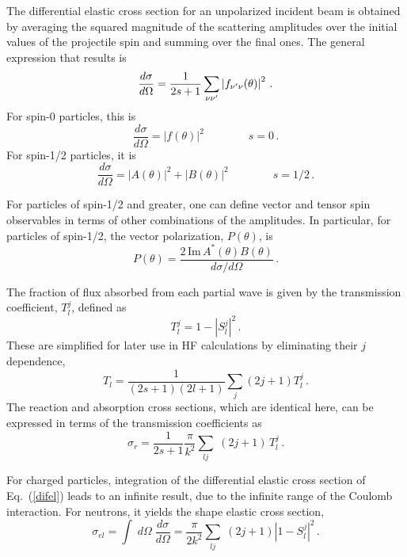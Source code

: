 The differential elastic cross section for an unpolarized incident beam is
obtained by averaging the squared magnitude of the scattering amplitudes
over the initial values of the projectile spin and summing over the final
ones. The general expression that results is 
\begin{equation}
\frac{d\sigma}{d\Omega}=\frac{1}{2s+1}\sum_{\nu\nu^{\prime}}\left|f_{\nu^{%
\prime}\nu}(\theta)\right|^{2}\,.  \label{difel}
\end{equation}
For spin-0 particles, this is 
\begin{equation}
\frac{d\sigma}{d\Omega}=\left|f(\theta)\right|^{2}\qquad\qquad s=0\,.
\end{equation}
For spin-1/2 particles, it is 
\begin{equation}
\frac{d\sigma}{d\Omega}=\left|A(\theta)\right|^{2}+\left|B(\theta)%
\right|^{2}\qquad\qquad s=1/2\,.
\end{equation}

For particles of spin-1/2 and greater, one can define vector and tensor spin
observables in terms of other combinations of the amplitudes. In particular,
for particles of spin-1/2, the vector polarization, $P(\theta)$, is 
\begin{equation}
P(\theta)=\frac{2\,\text{Im}\, A^{*}(\theta)B(\theta)}{d\sigma/d\Omega}\,.
\end{equation}

The fraction of flux absorbed from each partial wave is given by the
transmission coefficient, $T_{l}^{j}$, defined as 
\begin{equation}
T_{l}^{j}=1-\left|S_{l}^{j}\right|^{2}\,.
\end{equation}
These are simplified for later use in HF calculations by eliminating their $%
j $ dependence, 
\begin{equation}
T_{l}=\frac{1}{(2s+1)(2l+1)}\sum_j (2j+1) T_{l}^{j}\,.
\end{equation}
The reaction and absorption cross sections, which are identical here, can be
expressed in terms of the transmission coefficients as 
\begin{equation}
\sigma_{r}=\frac{1}{2s+1}\frac{\pi}{k^{2}}\sum_{lj}\;(2j+1)\, T_{l}^{j}\,.
\end{equation}

For charged particles, integration of the differential elastic cross section
of Eq.~(\ref{difel}) leads to an infinite result, due to the infinite range
of the Coulomb interaction. For neutrons, it yields the shape elastic cross
section, 
\begin{equation}
\sigma_{el}=\int\; d\Omega\;\frac{d\sigma}{d\Omega}=\frac{\pi}{2k^{2}}%
\sum_{lj}\;(2j+1)\left|1-S_{l}^{j}\right|^{2}\,.
\end{equation}

